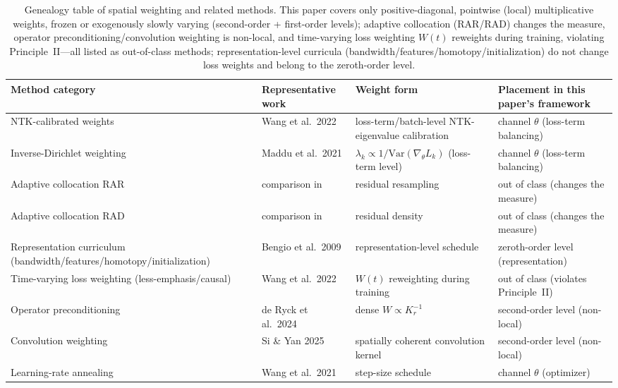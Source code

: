 \documentclass[11pt]{article}
\newcommand{\W}{W}
\numberwithin{equation}{section}
\begin{document}
\begin{table}[ht]\centering\small\renewcommand{\arraystretch}{1.15}
\begin{tabular}{p{2.8cm}p{3.2cm}p{3.0cm}p{3.5cm}}
\toprule
Method category & Representative work & Weight form & Placement in this paper's framework\\
\midrule
NTK-calibrated weights & Wang et al.\ 2022\cite{Wang2020NTK} & loss-term/batch-level NTK-eigenvalue calibration & channel $\theta$ (loss-term balancing)\\
Inverse-Dirichlet weighting & Maddu et al.\ 2021\cite{Maddu2021} & $\lambda_k\propto 1/\mathrm{Var}(\nabla_\theta L_k)$ (loss-term level) & channel $\theta$ (loss-term balancing)\\
Adaptive collocation RAR & comparison in \cite{Wu2022} & residual resampling & out of class (changes the measure)\\
Adaptive collocation RAD & comparison in \cite{Wu2022} & residual density & out of class (changes the measure)\\
Representation curriculum (bandwidth/\hspace{0pt}features/\hspace{0pt}homotopy/\hspace{0pt}initialization) & Bengio et al.\ 2009\cite{Bengio2009} & representation-level schedule & zeroth-order level (representation)\\
Time-varying loss weighting (less-emphasis/causal) & Wang et al.\ 2022\cite{LessEmphasis2022,Wang2022causal} & $W(t)$ reweighting during training & out of class (violates Principle~II)\\
Operator preconditioning & de Ryck et al.\ 2024\cite{deRyckOp2024} & dense $\W\propto K_r^{-1}$ & second-order level (non-local)\\
Convolution weighting & Si \& Yan 2025\cite{SiYan2025} & spatially coherent convolution kernel & second-order level (non-local)\\
Learning-rate annealing & Wang et al.\ 2021\cite{WangTeng2020} & step-size schedule & channel $\theta$ (optimizer)\\
\bottomrule
\end{tabular}
\caption{Genealogy table of spatial weighting and related methods. This paper covers only positive-diagonal, pointwise (local) multiplicative weights, frozen or exogenously slowly varying (second-order + first-order levels); adaptive collocation (RAR/RAD) changes the measure, operator preconditioning/convolution weighting is non-local, and time-varying loss weighting $W(t)$ reweights during training, violating Principle~II---all listed as out-of-class methods; representation-level curricula (bandwidth/features/homotopy/initialization) do not change loss weights and belong to the zeroth-order level.}\label{tab:lineage}
\end{table}
\end{document}
